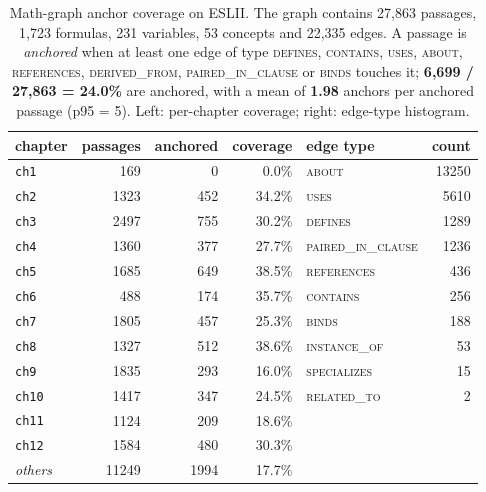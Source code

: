 \begin{table}[!htbp]
\centering
\caption{Math-graph anchor coverage on ESLII.  The graph contains 27,863 passages, 1,723 formulas, 231 variables, 53 concepts and 22,335 edges.  A passage is \emph{anchored} when at least one edge of type \textsc{defines}, \textsc{contains}, \textsc{uses}, \textsc{about}, \textsc{references}, \textsc{derived\_from}, \textsc{paired\_in\_clause} or \textsc{binds} touches it; \textbf{6,699 / 27,863 = 24.0\%} are anchored, with a mean of \textbf{1.98} anchors per anchored passage (p95 = 5).  Left: per-chapter coverage; right: edge-type histogram.}
\label{tab:m4-graph-coverage}
\small
\begin{tabular}{lrrr@{\hspace{2.5em}}lr}
\toprule
chapter & passages & anchored & coverage & edge type & count \\
\midrule
\texttt{ch1} &   169 &     0 & 0.0\% & \textsc{about} & 13250 \\
\texttt{ch2} &  1323 &   452 & 34.2\% & \textsc{uses} &  5610 \\
\texttt{ch3} &  2497 &   755 & 30.2\% & \textsc{defines} &  1289 \\
\texttt{ch4} &  1360 &   377 & 27.7\% & \textsc{paired\_in\_clause} &  1236 \\
\texttt{ch5} &  1685 &   649 & 38.5\% & \textsc{references} &   436 \\
\texttt{ch6} &   488 &   174 & 35.7\% & \textsc{contains} &   256 \\
\texttt{ch7} &  1805 &   457 & 25.3\% & \textsc{binds} &   188 \\
\texttt{ch8} &  1327 &   512 & 38.6\% & \textsc{instance\_of} &    53 \\
\texttt{ch9} &  1835 &   293 & 16.0\% & \textsc{specializes} &    15 \\
\texttt{ch10} &  1417 &   347 & 24.5\% & \textsc{related\_to} &     2 \\
\texttt{ch11} &  1124 &   209 & 18.6\% &  &  \\
\texttt{ch12} &  1584 &   480 & 30.3\% &  &  \\
\textit{others} & 11249 &  1994 & 17.7\% &  &  \\
\bottomrule
\end{tabular}
\end{table}
